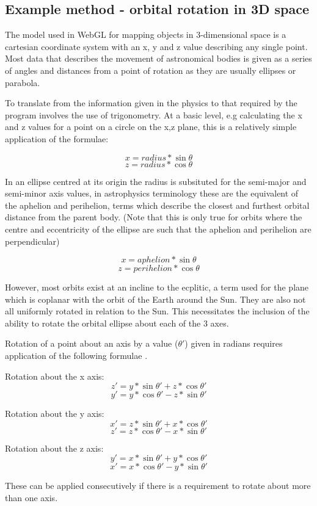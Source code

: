 \documentclass[twoside]{bhamthesis}
\begin{document}
\subsection{Example method - orbital rotation in 3D space}
The model used in WebGL for mapping objects in 3-dimensional space is a cartesian coordinate system with an x, y and z value describing any single point. Most data that describes the movement of astronomical bodies is given as a series of angles and distances from a point of rotation as they are usually ellipses or parabola.

To translate from the information given in the physics to that required by the program involves the use of trigonometry. At a basic level, e.g calculating the x and z values for a point on a circle on the x,z plane, this is a relatively simple application of the formulae:

\[x = radius*\sin\theta\]
\[z = radius*\cos\theta\]

In an ellipse centred at its origin the radius is subsituted for the semi-major and semi-minor axis values, in astrophysics terminology these are the equivalent of the aphelion and perihelion, terms which describe the closest and furthest orbital distance from the parent body. (Note that this is only true for orbits where the centre and eccentricity of the ellipse are such that the aphelion and perihelion are perpendicular)

\[x = aphelion*\sin\theta\]
\[z = perihelion*\cos\theta\]

However, most orbits exist at an incline to the ecplitic, a term used for the plane which is coplanar with the orbit of the Earth around the Sun. They are also not all uniformly rotated in relation to the Sun. This necessitates the inclusion of the ability to rotate the orbital ellipse about each of the 3 axes.

Rotation of a point about an axis by a value ($\theta'$) given in radians requires application of the following formulae \cite{acm_siggraph_education_committee_3d_2005}.

Rotation about the x axis:
\[z' = y*\sin\theta' + z*\cos\theta'\]
\[y' = y*\cos\theta' - z*\sin\theta'\]

Rotation about the y axis:
\[x' = z*\sin\theta' + x*\cos\theta'\]
\[z' = z*\cos\theta' - x*\sin\theta'\]

Rotation about the z axis:
\[y' = x*\sin\theta' + y*\cos\theta'\]
\[x' = x*\cos\theta' - y*\sin\theta'\]

These can be applied consecutively if there is a requirement to rotate about more than one axis.
\end{document}
